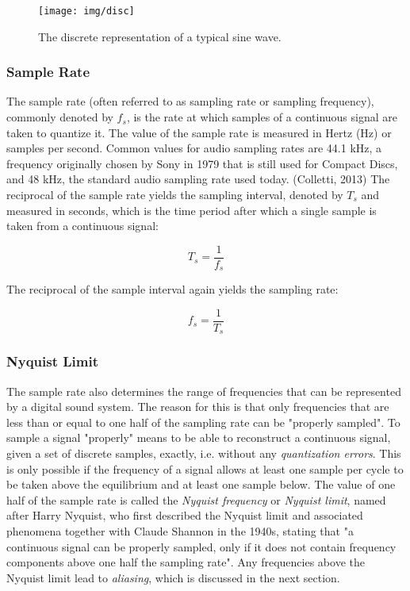 \begin{figure}[h!]

  \centering

  \texttt{[image: img/disc]}

  \caption{The discrete representation of a typical sine wave.}

  \label{fig:disc}

\end{figure}

\subsubsection{Sample Rate}

The sample rate (often referred to as sampling rate or sampling frequency), commonly denoted by $f_{s}$, is the rate at which samples of a continuous signal are taken to quantize it. The value of the sample rate is measured in Hertz (Hz) or samples per second. Common values for audio sampling rates are 44.1 kHz, a frequency originally chosen by Sony in 1979 that is still used for Compact Discs, and 48 kHz, the standard audio sampling rate used today.  (Colletti, 2013) The reciprocal of the sample rate yields the sampling interval, denoted by $T_{s}$ and measured in seconds, which is the time period after which a single sample is taken from a continuous signal:

\begin{equation}
   T_{s} = \frac{1}{f_{s}}
\end{equation}

\noindent The reciprocal of the sample interval again yields the sampling rate:

\begin{equation}
  f_{s} = \frac{1}{T_{s}}
\end{equation}

\subsubsection{Nyquist Limit}

The sample rate also determines the range of frequencies that can be represented by a digital sound system. The reason for this is that only frequencies that are less than or equal to one half of the sampling rate can be "properly sampled". To sample a signal "properly" means to be able to reconstruct a continuous signal, given a set of discrete samples, exactly, i.e. without any \emph{quantization errors}. This is only possible if the frequency of a signal allows at least one sample per cycle to be taken above the equilibrium and at least one sample below. The value of one half of the sample rate is called the \emph{Nyquist frequency} or \emph{Nyquist limit}, named after Harry Nyquist, who first described the Nyquist limit and associated phenomena together with Claude Shannon in the 1940s, stating that "a continuous signal can be properly sampled, only if it does not contain frequency components above one half the sampling rate". Any frequencies above the Nyquist limit lead to \emph{aliasing}, which is discussed in the next section. 

